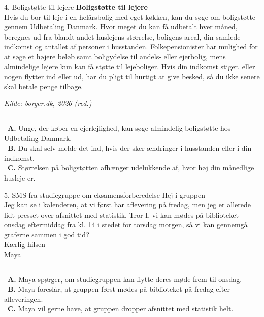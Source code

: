 \begin{emailbox}{4. Boligstøtte til lejere}
\textbf{Boligstøtte til lejere}\\
Hvis du bor til leje i en helårsbolig med eget køkken, kan du søge om boligstøtte gennem Udbetaling Danmark. Hvor meget du kan få udbetalt hver måned, beregnes ud fra blandt andet huslejens størrelse, boligens areal, din samlede indkomst og antallet af personer i husstanden. Folkepensionister har mulighed for at søge et højere beløb samt boligydelse til andels- eller ejerbolig, mens almindelige lejere kun kan få støtte til lejeboliger. Hvis din indkomst stiger, eller nogen flytter ind eller ud, har du pligt til hurtigt at give besked, så du ikke senere skal betale penge tilbage.
\par\vspace{0.15em}\strut\hfill {\small\textit{Kilde: borger.dk, 2026 (red.)}}

\vspace{0.3em}
\hrule
\vspace{0.3em}
\small
\fbox{\phantom{X}}\ \textbf{A.} Unge, der køber en ejerlejlighed, kan søge almindelig boligstøtte hos Udbetaling Danmark.\\[0.25em]
\fbox{\phantom{X}}\ \textbf{B.} Du skal selv melde det ind, hvis der sker ændringer i husstanden eller i din indkomst.\\[0.25em]
\fbox{\phantom{X}}\ \textbf{C.} Størrelsen på boligstøtten afhænger udelukkende af, hvor høj din månedlige husleje er.
\end{emailbox}

\begin{emailbox}{5. SMS fra studiegruppe om eksamensforberedelse}
Hej i gruppen\\
Jeg kan se i kalenderen, at vi først har aflevering på fredag, men jeg er allerede lidt presset over afsnittet med statistik. Tror I, vi kan mødes på biblioteket onsdag eftermiddag fra kl. 14 i stedet for torsdag morgen, så vi kan gennemgå graferne sammen i god tid?\\
Kærlig hilsen\\
Maya

\vspace{0.3em}
\hrule
\vspace{0.3em}
\small
\fbox{\phantom{X}}\ \textbf{A.} Maya spørger, om studiegruppen kan flytte deres møde frem til onsdag.\\[0.25em]
\fbox{\phantom{X}}\ \textbf{B.} Maya foreslår, at gruppen først mødes på biblioteket på fredag efter afleveringen.\\[0.25em]
\fbox{\phantom{X}}\ \textbf{C.} Maya vil gerne have, at gruppen dropper afsnittet med statistik helt.
\end{emailbox}

